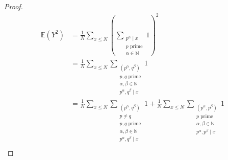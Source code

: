 \documentclass[12pt,reqno]{amsart}
\begin{document}
\begin{proof}
\begin{align*}
\mathbb{E} \left( Y^{2} \right) & = \frac{1}{N} \sum _{x \leq N} ( \sum _{\substack{ p ^{\alpha} \mid x \\ p \text{ prime} \\ \alpha \in  \mathbb{N}  }} 1 ) ^{2} \\
& = \frac{1}{N} \sum _{x \leq N} \sum _{\substack{ (p^{\alpha},q^{\beta}) \\ p,q \text{ prime} \\ \alpha , \beta \in \mathbb{N} \\ p ^{\alpha}, q^{\beta} \mid x }} 1\\
& = \frac{1}{N} \sum _{x \leq N} \sum _{\substack{ (p^{\alpha},q^{\beta})\\ p \neq q \\ p,q \text{ prime} \\ \alpha , \beta \in \mathbb{N} \\ p ^{\alpha}, q^{\beta} \mid x }} 1 + \frac{1}{N} \sum _{x \leq N} \sum _{\substack{ (p^{\alpha},p^{\beta}) \\ p \text{ prime} \\ \alpha , \beta \in \mathbb{N} \\ p ^{\alpha}, p^{\beta} \mid x }} 1\\
\end{align*}


\end{proof}
\end{document}
